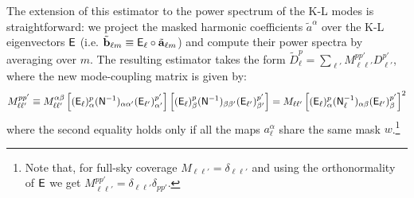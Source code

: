 \documentclass[twocolumn,amsfont,amssymb,amsmath, showpacs,balancelastpage, nofootinbib]{revtex4-1}
\begin{document}
  The extension of this estimator to the power spectrum of the K-L modes is straightforward: we project the masked harmonic coefficients $\tilde{a}^\alpha$ over the K-L eigenvectors ${\sf E}$ (i.e. $\tilde{\bf b}_{\ell m}\equiv {\sf E}_\ell\circ\tilde{\bf a}_{\ell m}$) and compute their power spectra by averaging over $m$. The resulting estimator takes the form $\tilde{D}^p_\ell=\sum_{\ell'}M_{\ell\ell'}^{pp'}D^{p'}_{\ell'}$, where the new mode-coupling matrix is given by:
  \begin{equation}
    M^{pp'}_{\ell\ell'}\equiv M^{\alpha\beta}_{\ell\ell'}\left[({\sf E}_\ell)^p_\alpha({\sf N}^{-1})_{\alpha\alpha'}({\sf E}_{\ell'})^{p'}_{\alpha'}\right]\left[({\sf E}_\ell)^p_\beta({\sf N}^{-1})_{\beta\beta'}({\sf E}_{\ell'})^{p'}_{\beta'}\right]
    =M_{\ell\ell'}\left[({\sf E}_\ell)^p_\alpha({\sf N}^{-1}_\ell)_{\alpha\beta}({\sf E}_{\ell'})^{p'}_\beta\right]^2
  \end{equation}
  where the second equality holds only if all the maps $a^\alpha_\ell$ share the same mask $w$.\footnote{Note that, for full-sky coverage $M_{\ell\ell'}=\delta_{\ell\ell'}$ and using the orthonormality of ${\sf E}$ we get $M^{pp'}_{\ell\ell'}=\delta_{\ell\ell'}\delta_{pp'}$.}
\end{document}
